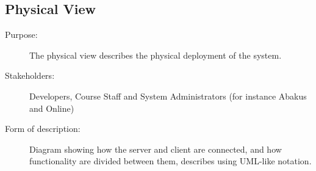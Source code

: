 \subsection{Physical View}
\begin{description}
  \item[Purpose:]{The physical view describes the physical deployment of the
    system.}
  \item[Stakeholders:]{Developers, Course Staff and System Administrators (for
    instance Abakus and Online)}
  \item[Form of description:]{Diagram showing how the server and client are
    connected, and how functionality are divided between them, describes using UML-like notation.}
\end{description}
